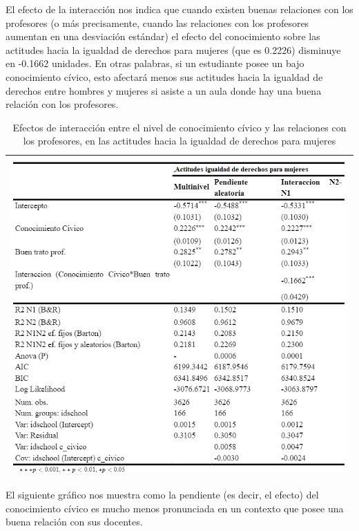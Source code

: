 \documentclass[12pt,twoside]{templates/facsothesis}
\begin{document}
El efecto de la interacción nos indica que cuando existen buenas relaciones con los profesores (o más precisamente, cuando las relaciones con los profesores aumentan en una desviación estándar) el efecto del conocimiento sobre las actitudes hacia la igualdad de derechos para mujeres (que es 0.2226) disminuye en -0.1662 unidades. En otras palabras, si un estudiante posee un bajo conocimiento cívico, esto afectará menos sus actitudes hacia la igualdad de derechos entre hombres y mujeres si asiste a un aula donde hay una buena relación con los profesores.

\begin{longtable}[]{@{}l@{}}
\caption{\label{tab:unnamed-chunk-13}Efectos de interacción entre el nivel de conocimiento cívico y las relaciones con los profesores, en las actitudes hacia la igualdad de derechos para mujeres}\tabularnewline
\toprule
\endhead
\includegraphics[width=\textwidth,height=0.7\textheight]{input/images/INTERACCION2.png} \\
\bottomrule
\end{longtable}

El siguiente gráfico nos muestra como la pendiente (es decir, el efecto) del conocimiento cívico es mucho menos pronunciada en un contexto que posee una buena relación con sus docentes.
\end{document}
